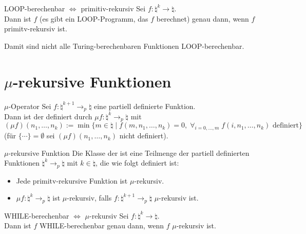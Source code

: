 \begin{Satz}{LOOP-berechenbar $\iff$ primitiv-rekursiv}
    Sei $f\colon \natural^k \rightarrow \natural$.\\
    Dann ist $f$  (es gibt ein LOOP-Programm, das $f$ berechnet)
    genau dann, wenn $f$ primitv-rekursiv ist.
\end{Satz}

\begin{Bem}
    Damit sind nicht alle Turing-berechenbaren Funktionen LOOP-berechenbar.
\end{Bem}

\section{%
    \texorpdfstring{$\mu$}{µ}-rekursive Funktionen%
}

\begin{Def}{$\mu$-Operator}
    Sei $f\colon \natural^{k+1} \rightarrow_p \natural$ eine partiell definierte Funktion.\\
    Dann ist der  definiert durch
    $\mu f\colon \natural^k \rightarrow_p \natural$ mit\\
    $(\mu f)(n_1, \dotsc, n_k) := \min\{m \in \natural \;|\; f(m, n_1, \dotsc, n_k) = 0,\;
    \forall_{i = 0, \dotsc, m}\; f(i, n_1, \dotsc, n_k) \text{ definiert}\}$\\
    (für $\{\dotsb\} = \emptyset$ sei $(\mu f)(n_1, \dotsc, n_k)$ nicht definiert).
\end{Def}

\begin{Def}{$\mu$-rekursive Funktion}
    Die Klasse der  ist eine Teilmenge der partiell
    definierten Funktionen $\natural^k \rightarrow_p \natural$ mit $k \in \natural$,
    die wie folgt definiert ist:
    \begin{itemize}
        \item
        Jede primitv-rekursive Funktion ist $\mu$-rekursiv.

        \item
        $\mu f\colon \natural^k \rightarrow_p \natural$ ist $\mu$-rekursiv,
        falls $f\colon \natural^{k+1} \rightarrow_p \natural$ $\mu$-rekursiv ist.
    \end{itemize}
\end{Def}

\begin{Satz}{WHILE-berechenbar $\iff$ $\mu$-rekursiv}
    Sei $f\colon \natural^k \rightarrow \natural$.\\
    Dann ist $f$ WHILE-berechenbar genau dann, wenn $f$ $\mu$-rekursiv ist.
\end{Satz}

